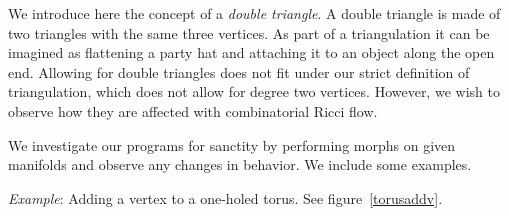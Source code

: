 \documentclass[12pt]{article}
\begin{document}
\noindent We introduce here the concept of a \textit{double triangle}. A double triangle is made of two triangles with the same three vertices. As part of a triangulation it can be imagined as flattening a party hat and attaching it to an object along the open end. Allowing for double triangles does not fit under our strict definition of triangulation, which does not allow for degree two vertices. However, we wish to observe how they are affected with combinatorial Ricci flow.\newline


\noindent We investigate our programs for sanctity by performing morphs on given manifolds and observe any changes in behavior. We include some examples. \newline

\noindent \textit{Example}: Adding a vertex to a one-holed torus. See figure~\ref{torusaddv}. \newline
\end{document}
